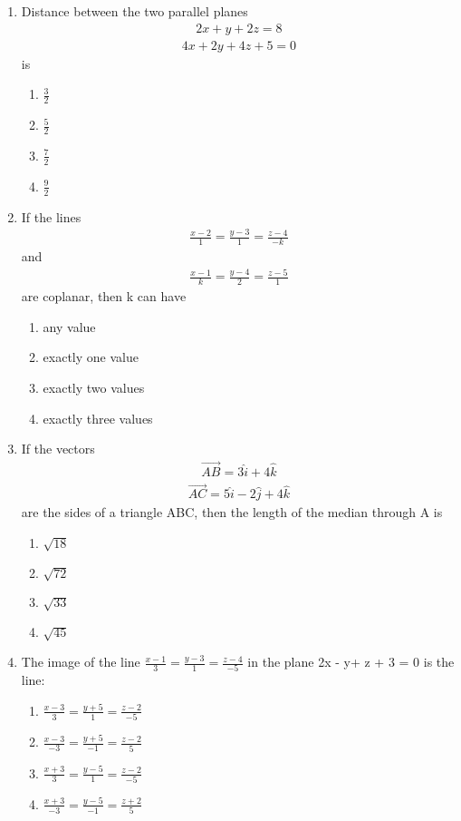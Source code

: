 \begin{enumerate}[label=\arabic*.,ref=\thesubsection.\theenumi]
\item Distance between the two parallel planes
\begin{align*}
2x+y+2z=8
\end{align*}
\begin{align*}
4x+2y+4z+5=0
\end{align*}
is
\begin{enumerate}
\item $\frac{3}{2}$
\item $\frac{5}{2}$
\item $\frac{7}{2}$
\item $\frac{9}{2}$
\end{enumerate}

\item If the lines 
\begin{align*}
\frac{x-2}{1} = \frac{y-3}{1} = \frac{z-4}{-k}
\end{align*}
and 
\begin{align*}
\frac{x-1}{k} = \frac{y-4}{2} = \frac{z-5}{1}
\end{align*}
are coplanar, then k can have
\begin{enumerate}
\item any value
\item exactly one value
\item exactly two values
\item exactly three values
\end{enumerate}

\item If the vectors 
\begin{align*}
\overrightarrow{AB} = 3\hat{i} + 4\hat{k}
\end{align*}
\begin{align*}
\overrightarrow{AC} = 5\hat{i} - 2\hat{j} + 4\hat{k}
\end{align*}
are the sides of a triangle ABC, then the length of the median through A is
\begin{enumerate}
\item $\sqrt{18}$
\item $\sqrt{72}$
\item $\sqrt{33}$
\item $\sqrt{45}$
\end{enumerate}

\item The image of the line $\frac{x-1}{3} = \frac{y-3}{1} = \frac{z-4}{-5}$ in the plane 2x - y+ z + 3 = 0 is the line:
\begin{enumerate}
\item $\frac{x-3}{3} = \frac{y+5}{1} = \frac{z-2}{-5}$
\item $\frac{x-3}{-3} = \frac{y+5}{-1} = \frac{z-2}{5}$
\item $\frac{x+3}{3} = \frac{y-5}{1} = \frac{z-2}{-5}$
\item $\frac{x+3}{-3} = \frac{y-5}{-1} = \frac{z+2}{5}$ 
\end{enumerate}


\end{enumerate}
